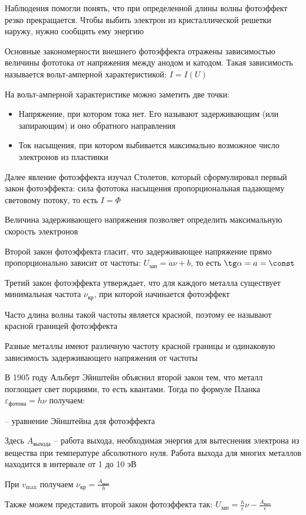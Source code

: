 Наблюдения помогли понять, что при определенной длины волны фотоэффект резко прекращается. Чтобы выбить электрон из кристаллической решетки наружу, нужно сообщить ему энергию

Основные закономерности внешнего фотоэффекта отражены зависимостью величины фототока от напряжения между анодом и катодом. Такая зависимость называется вольт-амперной характеристикой: $I = I(U)$


На вольт-амперной характеристике можно заметить две точки:

\begin{itemize}
    \item Напряжение, при котором тока нет. Его называют задерживающим (или запирающим) и оно обратного направления
    \item Ток насыщения, при котором выбивается максимально возможное число электронов из пластинки
\end{itemize}

\mediumvspace

Далее явление фотоэффекта изучал Столетов, который сформулировал первый закон фотоэффекта: сила фототока насыщения пропорциональная падающему световому потоку, то есть $I = \Phi$

Величина задерживающего напряжения позволяет определить максимальную скорость электронов

Второй закон фотоэффекта гласит, что задерживающее напряжение прямо пропорционально зависит от частоты: $U_\text{зап} = a\nu + b$, то есть $\tg \alpha = a = \const$

Третий закон фотоэффекта утверждает, что для каждого металла существует минимальная частота $\nu_{\text{кр}}$, при которой начинается фотоэффект

Часто длина волны такой частоты является красной, поэтому ее называют красной границей фотоэффекта

Разные металлы имеют различную частоту красной границы и одинаковую зависимость задерживающего напряжения от частоты

\mediumvspace

В 1905 году Альберт Эйнштейн объяснил второй закон тем, что металл поглощает свет порциями, то есть квантами. Тогда по формуле Планка $\varepsilon_{\text{фотона}} = h \nu$ получаем:

 -- уравнение Эйнштейна для фотоэффекта

\smallvspace

Здесь $A_{\text{выхода}}$ -- работа выхода, необходимая энергия для вытеснения электрона из вещества при температуре абсолютного нуля. Работа выхода для многих металлов находится в интервале от 1 до 10 эВ

При $v_{\max}$ получаем $\nu_\text{кр} = \frac{A_\text{вых}}{h}$

Также можем представить второй закон фотоэффекта так: $U_\text{зап} = \frac{h}{e} \nu - \frac{A_\text{вых}}{e}$

